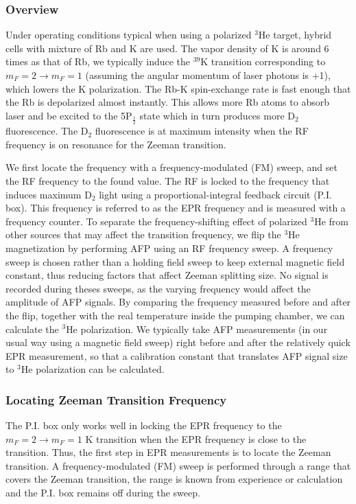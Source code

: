\subsubsection{Overview}

Under operating conditions typical when using a polarized $^3$He target, hybrid cells with mixture of Rb and K are used. The vapor density of K is around 6 times as that of Rb, we typically induce the $^{39}$K transition corresponding to $m_{F} = 2 \rightarrow m_{F} = 1$ (assuming the angular momentum of laser photons is +1), which lowers the K polarization. The Rb-K spin-exchange rate is fast enough that the Rb is depolarized almost instantly. This allows more Rb atoms to absorb laser and be excited to the 5P$_{\frac{1}{2}}$ state which in turn produces more D$_{2}$ fluorescence. The D$_{2}$ fluorescence is at maximum intensity when the RF frequency is on resonance for the Zeeman transition. 

We first locate the frequency with a frequency-modulated (FM) sweep, and set the RF frequency to the found value. The RF is locked to the frequency that induces maximum D$_{2}$ light using a proportional-integral feedback circuit (P.I. box). This frequency is referred to as the EPR frequency and is measured with a frequency counter. To separate the frequency-shifting effect of polarized $^{3}$He from other sources that may affect the transition frequency, we flip the $^{3}$He magnetization by performing AFP using an RF frequency sweep. A frequency sweep is chosen rather than a holding field sweep  to keep external magnetic field constant, thus reducing factors that affect Zeeman splitting size. No signal is recorded during theses sweeps, as the varying frequency would affect the amplitude of AFP signals. By comparing the frequency measured before and after the flip, together with the real temperature inside the pumping chamber, we can calculate the $^{3}$He polarization. We typically take AFP measurements (in our usual way using a magnetic field sweep) right before and after the relatively quick EPR measurement, so that a calibration constant that translates AFP signal size to $^{3}$He polarization can be calculated.

\subsubsection{Locating Zeeman Transition Frequency}

The P.I. box only works well in locking the EPR frequency to the $m_{F}=2\rightarrow m_{F}=1$ K transition when the EPR frequency is close to the transition. Thus, the first step in EPR measurements is to locate the Zeeman transition. A frequency-modulated (FM) sweep is performed through a range that covers the Zeeman transition, the range is known from experience or calculation and the P.I. box remains off during the sweep.

